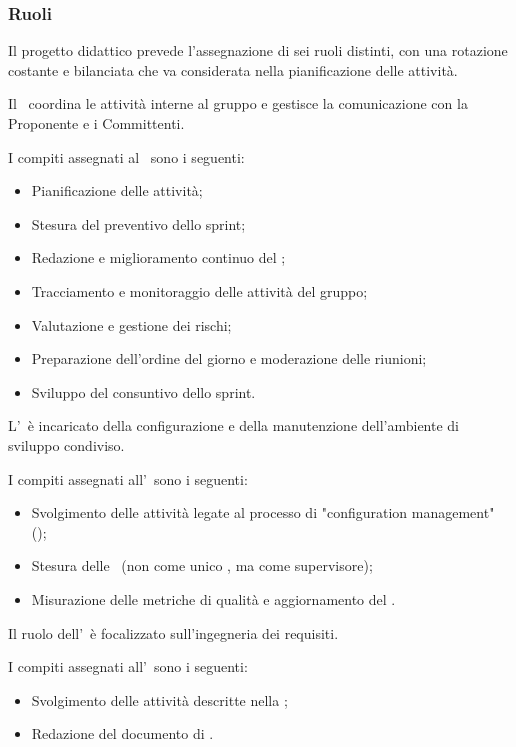 \subsubsection{Ruoli}
\par Il progetto didattico prevede l'assegnazione di sei ruoli distinti, con una rotazione costante e bilanciata che va considerata nella pianificazione delle attività.

\par Il \Responsabile\ coordina le attività interne al gruppo e gestisce la comunicazione con la Proponente e i Committenti.
\par I compiti assegnati al \Responsabile\ sono i seguenti:
\begin{itemize}
  \item Pianificazione delle attività;
  \item Stesura del preventivo dello sprint;
  \item Redazione e miglioramento continuo del \PdP;
  \item Tracciamento e monitoraggio delle attività del gruppo;
  \item Valutazione e gestione dei rischi;
  \item Preparazione dell'ordine del giorno e moderazione delle riunioni;
  \item Sviluppo del consuntivo dello sprint.
\end{itemize}

\par L'\Amministratore\ è incaricato della configurazione e della manutenzione dell'ambiente di sviluppo condiviso.
\par I compiti assegnati all'\Amministratore\ sono i seguenti:
\begin{itemize}
  \item Svolgimento delle attività legate al processo di "configuration management" ();
  \item Stesura delle \NdP\ (non come unico \Redattore, ma come supervisore);
  \item Misurazione delle metriche di qualità e aggiornamento del \PdQ.
\end{itemize}

\par Il ruolo dell'\Analista\ è focalizzato sull'ingegneria dei requisiti.
\par I compiti assegnati all'\Analista\ sono i seguenti:
\begin{itemize}
  \item Svolgimento delle attività descritte nella ;
  \item Redazione del documento di \AdR.
\end{itemize}

